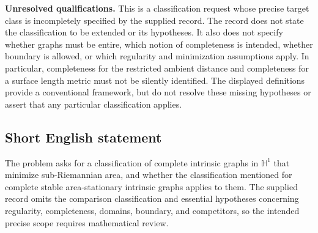 \documentclass[11pt]{article}
\begin{document}
\textbf{Unresolved qualifications.} This is a classification request whose precise target class is incompletely specified by the supplied record. The record does not state the classification to be extended or its hypotheses. It also does not specify whether graphs must be entire, which notion of completeness is intended, whether boundary is allowed, or which regularity and minimization assumptions apply. In particular, completeness for the restricted ambient distance and completeness for a surface length metric must not be silently identified. The displayed definitions provide a conventional framework, but do not resolve these missing hypotheses or assert that any particular classification applies.
\subsection{Short English statement}
The problem asks for a classification of complete intrinsic graphs in \(\mathbb H^1\) that minimize sub-Riemannian area, and whether the classification mentioned for complete stable area-stationary intrinsic graphs applies to them. The supplied record omits the comparison classification and essential hypotheses concerning regularity, completeness, domains, boundary, and competitors, so the intended precise scope requires mathematical review.
\end{document}
